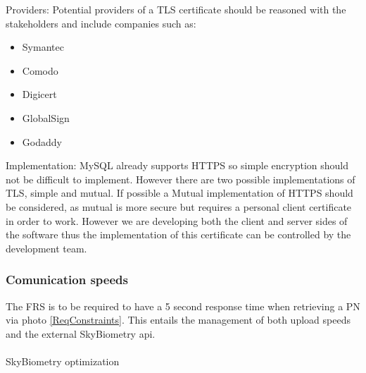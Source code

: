 \documentclass[a4paper,11pt]{article}
\begin{document}
Providers: Potential providers of a TLS certificate should be reasoned with the stakeholders and include companies such as:
\begin{itemize}
\item   Symantec
\item	Comodo
\item	Digicert
\item	GlobalSign 
\item	Godaddy
\end{itemize}
Implementation:
MySQL already supports HTTPS so simple encryption should not be difficult to implement. However there are two possible implementations of TLS, simple and mutual. If possible a Mutual implementation of HTTPS should be considered, as mutual is more secure but requires a personal client certificate in order to work. However we are developing both the client and server sides of the software thus the implementation of this certificate can be controlled by the development team.
	
\subsubsection{Comunication speeds}
	
The FRS is to be required to have a 5 second response time when retrieving a PN via photo \ref{ReqConstraints}. This entails the management of both upload speeds and the external SkyBiometry api.
\\\\
SkyBiometry optimization
	
\end{document}
